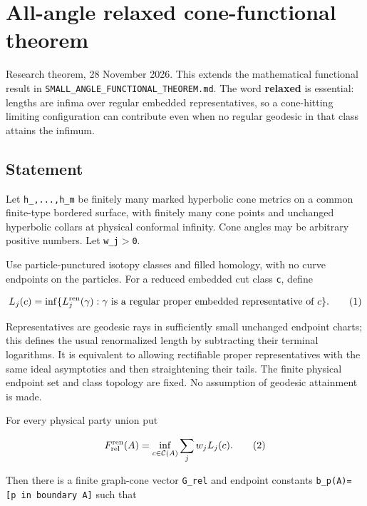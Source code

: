 \documentclass[11pt]{article}
\renewcommand{\textgreater}{\ensuremath{>}}
\begin{document}
\clearpage

\section{All-angle relaxed cone-functional
theorem}\label{all-angle-relaxed-cone-functional-theorem}

Research theorem, 28 November 2026. This extends the mathematical
functional result in \texttt{SMALL\_\allowbreak ANGLE\_\allowbreak FUNCTIONAL\_\allowbreak THEOREM.md}. The
word \textbf{relaxed} is essential: lengths are infima over regular
embedded representatives, so a cone-hitting limiting configuration can
contribute even when no regular geodesic in that class attains the
infimum.

\subsection{Statement}\label{statement}

Let \texttt{h\_,...,h\_\allowbreak m} be finitely many marked hyperbolic cone
metrics on a common finite-type bordered surface, with finitely many
cone points and unchanged hyperbolic collars at physical conformal
infinity. Cone angles may be arbitrary positive numbers. Let
\texttt{w\_\allowbreak j\textgreater{}0}.

Use particle-punctured isotopy classes and filled homology, with no
curve endpoints on the particles. For a reduced embedded cut class
\texttt{c}, define

\[
L_j(c)=\inf\{L_j^{\rm ren}(\gamma):
\gamma\text{ is a regular proper embedded representative of }c\}.
\tag{1}
\]

Representatives are geodesic rays in sufficiently small unchanged
endpoint charts; this defines the usual renormalized length by
subtracting their terminal logarithms. It is equivalent to allowing
rectifiable proper representatives with the same ideal asymptotics and
then straightening their tails. The finite physical endpoint set and
class topology are fixed. No assumption of geodesic attainment is made.

For every physical party union put

\[
F_{\rm rel}^{\rm ren}(A)=
\inf_{c\in\mathcal C(A)}\sum_jw_jL_j(c).
\tag{2}
\]

Then there is a finite graph-cone vector \texttt{G\_\allowbreak rel} and endpoint
constants \texttt{b\_\allowbreak p(A)={[}p\ in\ boundary\ A{]}} such that
\end{document}
